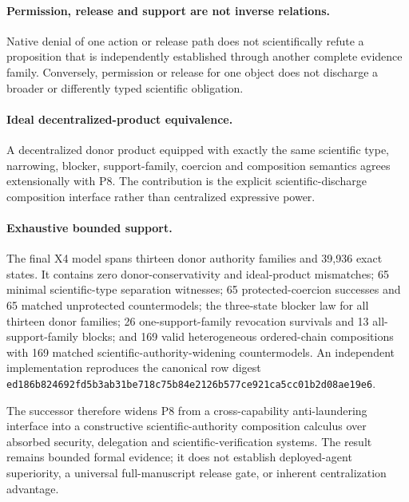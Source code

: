 \paragraph{Permission, release and support are not inverse relations.}
Native denial of one action or release path does not scientifically refute a proposition that is independently established through another complete evidence family. Conversely, permission or release for one object does not discharge a broader or differently typed scientific obligation.

\paragraph{Ideal decentralized-product equivalence.}
A decentralized donor product equipped with exactly the same scientific type, narrowing, blocker, support-family, coercion and composition semantics agrees extensionally with P8. The contribution is the explicit scientific-discharge composition interface rather than centralized expressive power.

\paragraph{Exhaustive bounded support.}
The final X4 model spans thirteen donor authority families and 39,936 exact states. It contains zero donor-conservativity and ideal-product mismatches; 65 minimal scientific-type separation witnesses; 65 protected-coercion successes and 65 matched unprotected countermodels; the three-state blocker law for all thirteen donor families; 26 one-support-family revocation survivals and 13 all-support-family blocks; and 169 valid heterogeneous ordered-chain compositions with 169 matched scientific-authority-widening countermodels. An independent implementation reproduces the canonical row digest \texttt{ed186b824692fd5b3ab31be718c75b84e2126b577ce921ca5cc01b2d08ae19e6}.

The successor therefore widens P8 from a cross-capability anti-laundering interface into a constructive scientific-authority composition calculus over absorbed security, delegation and scientific-verification systems. The result remains bounded formal evidence; it does not establish deployed-agent superiority, a universal full-manuscript release gate, or inherent centralization advantage.
